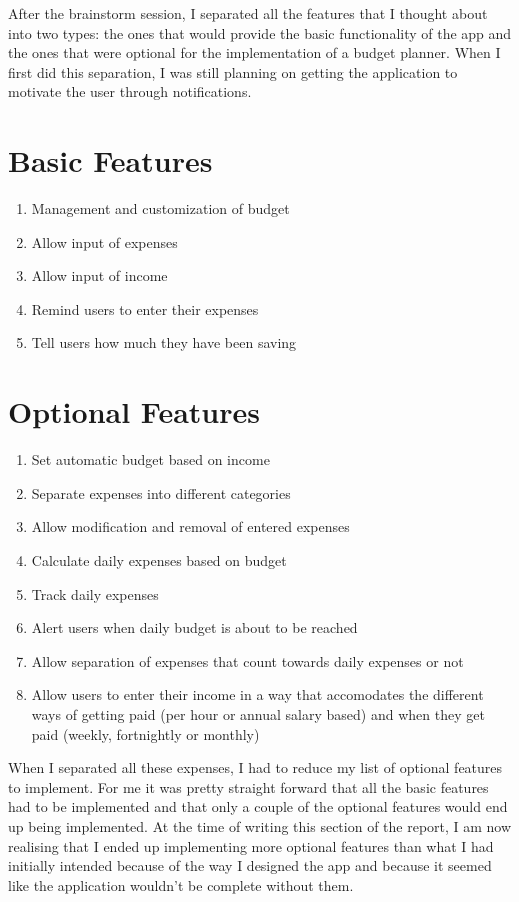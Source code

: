 After the brainstorm session, I separated all the features that I thought about into two types: the ones that would provide the basic functionality of the app and the ones that were optional for the implementation of a budget planner. When I first did this separation, I was still planning on getting the application to motivate the user through notifications.

\section{Basic Features}
\begin{enumerate}
  \item Management and customization of budget
  \item Allow input of expenses
  \item Allow input of income
  \item Remind users to enter their expenses
  \item Tell users how much they have been saving
\end{enumerate}

\section{Optional Features}
\begin{enumerate}
  \item Set automatic budget based on income
  \item Separate expenses into different categories
  \item Allow modification and removal of entered expenses
  \item Calculate daily expenses based on budget
  \item Track daily expenses
  \item Alert users when daily budget is about to be reached
  \item Allow separation of expenses that count towards daily expenses or not
  \item Allow users to enter their income in a way that accomodates the different ways of getting paid (per hour or annual salary based) and when they get paid (weekly, fortnightly or monthly)
\end{enumerate}

When I separated all these expenses, I had to reduce my list of optional features to implement. For me it was pretty straight forward that all the basic features had to be implemented and that only a couple of the optional features would end up being implemented. At the time of writing this section of the report, I am now realising that I ended up implementing more optional features than what I had initially intended because of the way I designed the app and because it seemed like the application wouldn't be complete without them.

